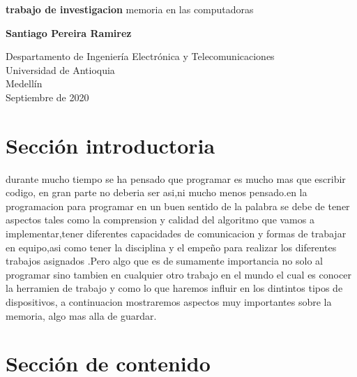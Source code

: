 \documentclass{article}
\begin{document}
\begin{titlepage}
    \begin{center}
        \vspace*{1cm}
            
        \Huge
        \textbf{trabajo de investigacion}
        \vspace{0.5cm}
        \LARGE
        memoria en las computadoras
            
        \vspace{1.5cm}
            
        \textbf{Santiago Pereira Ramirez}
            
        \vfill
            
        \vspace{0.8cm}
            
        \Large
        Despartamento de Ingeniería Electrónica y Telecomunicaciones\\
        Universidad de Antioquia\\
        Medellín\\
        Septiembre de 2020
            
    \end{center}
\end{titlepage}

\tableofcontents

\section{Sección introductoria}
durante mucho tiempo se ha pensado que programar es mucho mas que  escribir codigo, en gran parte no deberia ser asi,ni mucho menos pensado.en la programacion para programar en un buen sentido de la palabra se debe de tener aspectos tales como la comprension y calidad del algoritmo que vamos a implementar,tener diferentes capacidades de comunicacion 
y formas de trabajar en equipo,asi como tener la disciplina y el empeño para realizar los diferentes trabajos asignados .Pero algo que es de sumamente importancia 
no solo al programar sino tambien en cualquier otro trabajo en el mundo el cual es conocer la herramien de trabajo y como lo que haremos influir en los dintintos 
tipos de dispositivos, a continuacion mostraremos aspectos muy importantes sobre la memoria, algo mas alla de guardar.

\section{Sección de contenido} \label{contenido}
\end{document}
